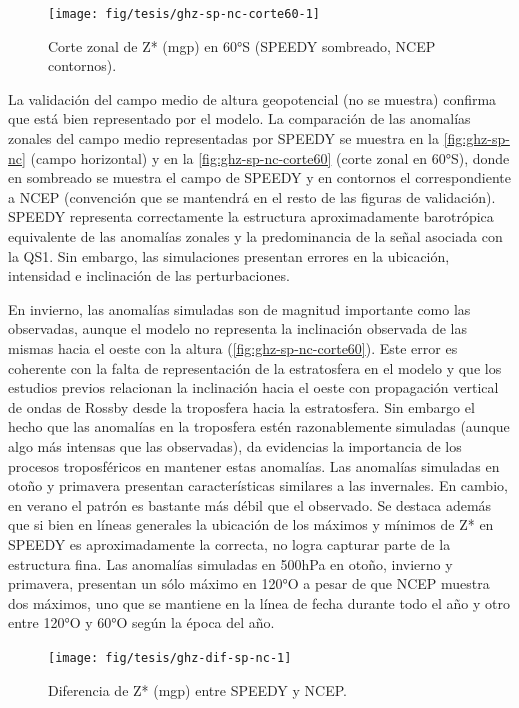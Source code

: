 \documentclass[spanish,a4paper,12pt,oneside]{book}
\begin{document}
\begin{figure}
\texttt{[image: fig/tesis/ghz-sp-nc-corte60-1]} \caption{Corte zonal de Z* (mgp) en 60°S (SPEEDY sombreado, NCEP contornos).}\label{fig:ghz-sp-nc-corte60}
\end{figure}

La validación del campo medio de altura geopotencial (no se muestra)
confirma que está bien representado por el modelo. La comparación de las
anomalías zonales del campo medio representadas por SPEEDY se muestra en
la \autoref{fig:ghz-sp-nc} (campo horizontal) y en la
\autoref{fig:ghz-sp-nc-corte60} (corte zonal en 60°S), donde en
sombreado se muestra el campo de SPEEDY y en contornos el
correspondiente a NCEP (convención que se mantendrá en el resto de las
figuras de validación). SPEEDY representa correctamente la estructura
aproximadamente barotrópica equivalente de las anomalías zonales y la
predominancia de la señal asociada con la QS1. Sin embargo, las
simulaciones presentan errores en la ubicación, intensidad e inclinación
de las perturbaciones.

En invierno, las anomalías simuladas son de magnitud importante como las
observadas, aunque el modelo no representa la inclinación observada de
las mismas hacia el oeste con la altura
(\autoref{fig:ghz-sp-nc-corte60}). Este error es coherente con la falta
de representación de la estratosfera en el modelo y que los estudios
previos relacionan la inclinación hacia el oeste con propagación
vertical de ondas de Rossby desde la troposfera hacia la estratosfera.
Sin embargo el hecho que las anomalías en la troposfera estén
razonablemente simuladas (aunque algo más intensas que las observadas),
da evidencias la importancia de los procesos troposféricos en mantener
estas anomalías. Las anomalías simuladas en otoño y primavera presentan
características similares a las invernales. En cambio, en verano el
patrón es bastante más débil que el observado. Se destaca además que si
bien en líneas generales la ubicación de los máximos y mínimos de Z* en
SPEEDY es aproximadamente la correcta, no logra capturar parte de la
estructura fina. Las anomalías simuladas en 500hPa en otoño, invierno y
primavera, presentan un sólo máximo en 120°O a pesar de que NCEP muestra
dos máximos, uno que se mantiene en la línea de fecha durante todo el
año y otro entre 120°O y 60°O según la época del año.

\begin{landscape}\begin{figure}

{\centering \texttt{[image: fig/tesis/ghz-dif-sp-nc-1]} 

}

\caption{Diferencia de Z* (mgp) entre SPEEDY y NCEP.}\label{fig:ghz-dif-sp-nc}
\end{figure}
\end{landscape}
\end{document}
